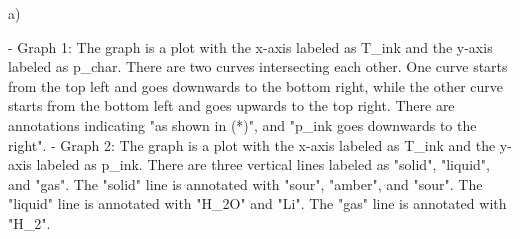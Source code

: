 a)

- Graph 1: The graph is a plot with the x-axis labeled as T_ink and the y-axis labeled as p_char. There are two curves intersecting each other. One curve starts from the top left and goes downwards to the bottom right, while the other curve starts from the bottom left and goes upwards to the top right. There are annotations indicating "as shown in (*)", and "p_ink goes downwards to the right".
- Graph 2: The graph is a plot with the x-axis labeled as T_ink and the y-axis labeled as p_ink. There are three vertical lines labeled as "solid", "liquid", and "gas". The "solid" line is annotated with "sour", "amber", and "sour". The "liquid" line is annotated with "H_2O" and "Li". The "gas" line is annotated with "H_2".